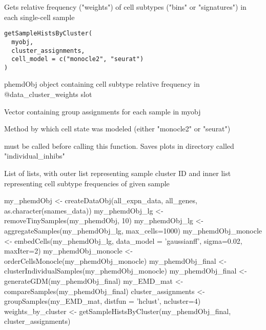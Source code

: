 \documentclass[a4paper]{book}
\begin{document}
%
\begin{Description}\relax
Gets relative frequency ("weights") of cell subtypes ("bins" or "signatures") in each single-cell sample
\end{Description}
%
\begin{Usage}
\begin{verbatim}
getSampleHistsByCluster(
  myobj,
  cluster_assignments,
  cell_model = c("monocle2", "seurat")
)
\end{verbatim}
\end{Usage}
%
\begin{Arguments}
\begin{ldescription}
\item[\code{myobj}] phemdObj object containing cell subtype relative frequency in @data\_cluster\_weights slot

\item[\code{cluster\_assignments}] Vector containing group assignments for each sample in myobj

\item[\code{cell\_model}] Method by which cell state was modeled (either "monocle2" or "seurat")
\end{ldescription}
\end{Arguments}
%
\begin{Details}\relax
{} must be called before calling this function. Saves plots in directory called "individual\_inhibs"
\end{Details}
%
\begin{Value}
List of lists, with outer list representing sample cluster ID and inner list representing cell subtype frequencies of given sample
\end{Value}
%
\begin{Examples}
\begin{ExampleCode}

my_phemdObj <- createDataObj(all_expn_data, all_genes, as.character(snames_data))
my_phemdObj_lg <- removeTinySamples(my_phemdObj, 10)
my_phemdObj_lg <- aggregateSamples(my_phemdObj_lg, max_cells=1000)
my_phemdObj_monocle <- embedCells(my_phemdObj_lg, data_model = 'gaussianff', sigma=0.02, maxIter=2)
my_phemdObj_monocle <- orderCellsMonocle(my_phemdObj_monocle)
my_phemdObj_final <- clusterIndividualSamples(my_phemdObj_monocle)
my_phemdObj_final <- generateGDM(my_phemdObj_final)
my_EMD_mat <- compareSamples(my_phemdObj_final)
cluster_assignments <- groupSamples(my_EMD_mat, distfun = 'hclust', ncluster=4)
weights_by_cluster <- getSampleHistsByCluster(my_phemdObj_final, cluster_assignments)

\end{ExampleCode}
\end{Examples}
\end{document}
